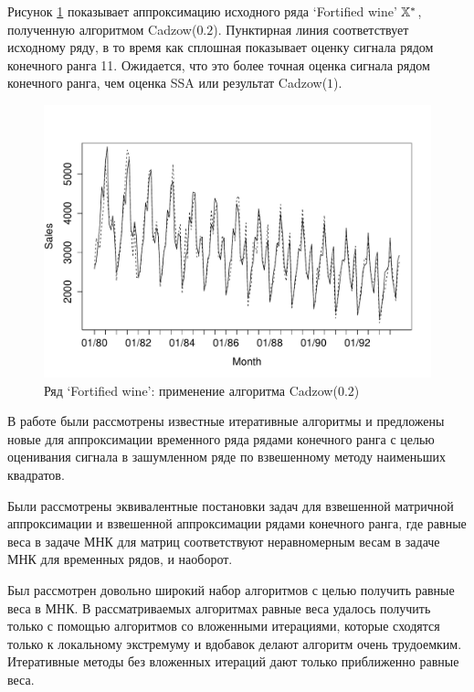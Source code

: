 \documentclass[12pt, specialist, subf,href,colorlinks=true,substylefile = spbu.rtx]{disser}
\theoremstyle{remark}
\theoremstyle{definition}
\begin{document}
Рисунок \ref{fig:rl} показывает аппроксимацию исходного ряда `Fortified wine' $\mathbb{X}^*$, полученную алгоритмом Cadzow($0.2$). 
Пунктирная линия соответствует исходному ряду, в то время как сплошная показывает оценку сигнала рядом конечного ранга 11.
Ожидается, что это более точная оценка сигнала рядом конечного ранга, чем оценка SSA или результат Cadzow($1$).

\begin{figure}[!hhh]
	\includegraphics[width=\columnwidth]{rlimage.pdf}
	\caption{Ряд `Fortified wine': применение алгоритма Cadzow($0.2$)}
	\label{fig:rl}
\end{figure}

\conclusion
\label{sec:concl}
В работе были рассмотрены известные итеративные алгоритмы и предложены новые для аппроксимации временного ряда рядами конечного ранга с целью
оценивания сигнала в зашумленном ряде по взвешенному методу наименьших квадратов.

Были рассмотрены эквивалентные постановки задач для взвешенной матричной аппроксимации и взвешенной аппроксимации рядами конечного ранга, где равные веса в задаче МНК для матриц соответствуют неравномерным весам в задаче МНК для временных рядов, и наоборот.

Был рассмотрен довольно широкий набор алгоритмов с целью получить равные веса в МНК. В рассматриваемых алгоритмах равные веса удалось
получить только с помощью алгоритмов со вложенными итерациями, которые сходятся только к локальному экстремуму и вдобавок делают алгоритм очень трудоемким.
Итеративные методы без вложенных итераций дают только приближенно равные веса.
\end{document}
